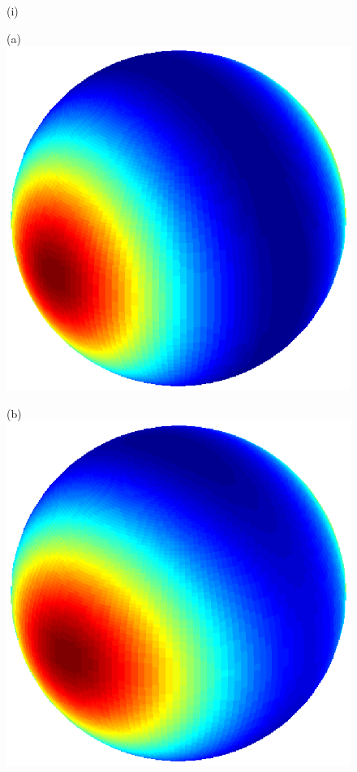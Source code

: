 \documentclass[dvips,aoas,preprint]{imsart}
\numberwithin{equation}{section}
\theoremstyle{plain}
\begin{document}
\begin{figure}[!htbp]
(i)
    \begin{minipage}[]{0.12\textwidth}
      \centering
      (a)
      \includegraphics*[width=\textwidth]{figure1a1.eps}
    \end{minipage}
    \begin{minipage}[]{0.12\textwidth}
      \centering
      (b)
      \includegraphics*[width=\textwidth]{figure1e1.eps}

\end{minipage}
\end{figure}
\end{document}
